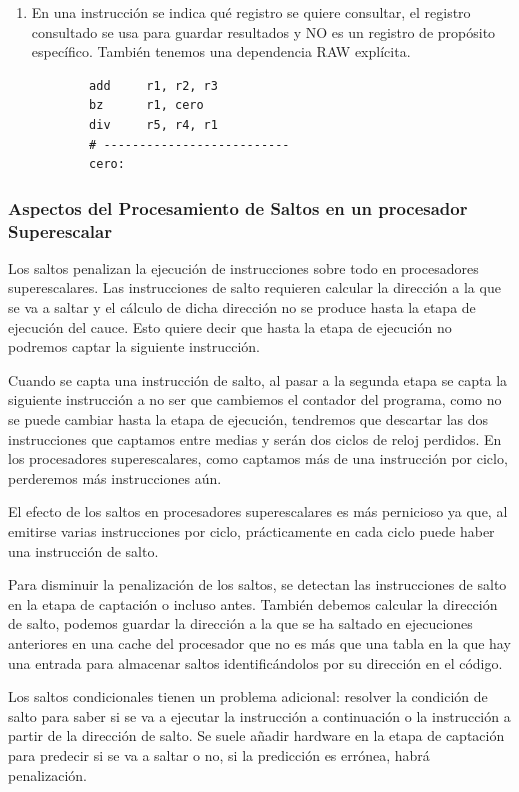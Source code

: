 \documentclass[10pt,a4paper,spanish]{report}
\begin{document}
\begin{enumerate}[\color{azul}{$\heartsuit$}]
\begin{enumerate}[$\longrightarrow$]
        \item En una instrucción se indica qué registro se quiere consultar, el registro consultado se usa para guardar resultados y NO es un registro de propósito específico. También tenemos una dependencia RAW explícita.

        \begin{verbatim}
        add     r1, r2, r3
        bz      r1, cero
        div     r5, r4, r1
        # --------------------------
        cero:
        \end{verbatim}

    \end{enumerate}
\end{enumerate}

\textcolor{azul}{\subsubsection{Aspectos del Procesamiento de Saltos en un procesador Superescalar}}
Los saltos penalizan la ejecución de instrucciones sobre todo en procesadores superescalares. Las instrucciones de salto requieren calcular la dirección a la que se va a saltar y el cálculo de dicha dirección no se produce hasta la etapa de ejecución del cauce. Esto quiere decir que hasta la etapa de ejecución no podremos captar la siguiente instrucción.

Cuando se capta una instrucción de salto, al pasar a la segunda etapa se capta la siguiente instrucción a no ser que cambiemos el contador del programa, como no se puede cambiar hasta la etapa de ejecución, tendremos que descartar las dos instrucciones que captamos entre medias y serán dos ciclos de reloj perdidos. En los procesadores superescalares, como captamos más de una instrucción por ciclo, perderemos más instrucciones aún.

El efecto de los saltos en procesadores superescalares es más pernicioso ya que, al emitirse varias instrucciones por ciclo, prácticamente en cada ciclo puede haber una instrucción de salto.

Para disminuir la penalización de los saltos, se detectan las instrucciones de salto en la etapa de captación o incluso antes. También debemos calcular la dirección de salto, podemos guardar la dirección a la que se ha saltado en ejecuciones anteriores en una cache del procesador que no es más que una tabla en la que hay una entrada para almacenar saltos identificándolos por su dirección en el código.

Los saltos condicionales tienen un problema adicional: resolver la condición de salto para saber si se va a ejecutar la instrucción a continuación o la instrucción a partir de la dirección de salto. Se suele añadir hardware en la etapa de captación para predecir si se va a saltar o no, si la predicción es errónea, habrá penalización.
\end{document}

